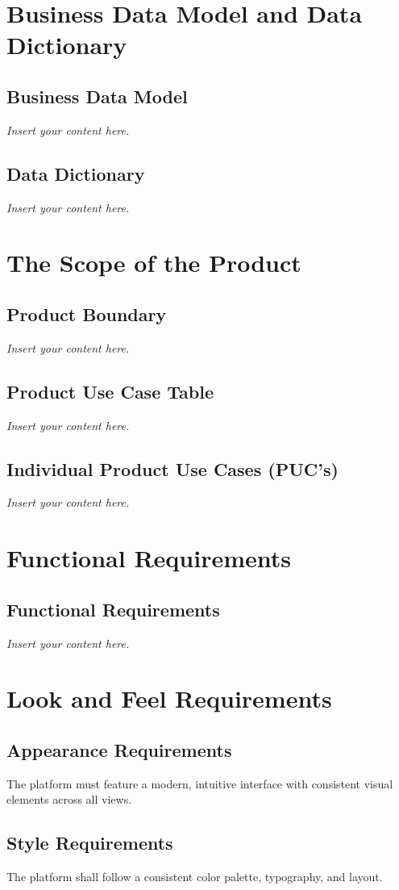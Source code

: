 \documentclass[12pt]{article}
\newcommand{\lips}{\textit{Insert your content here.}}
\begin{document}
\section{Business Data Model and Data Dictionary}
\subsection{Business Data Model}
\lips
\subsection{Data Dictionary}
\lips

\section{The Scope of the Product}
\subsection{Product Boundary}
\lips
\subsection{Product Use Case Table}
\lips
\subsection{Individual Product Use Cases (PUC's)}
\lips

\section{Functional Requirements}
\subsection{Functional Requirements}
\lips

\section{Look and Feel Requirements}
\subsection{Appearance Requirements}
The platform must feature a modern, intuitive interface with consistent visual elements across all views.

\subsection{Style Requirements}
The platform shall follow a consistent color palette, typography, and layout.
\end{document}
